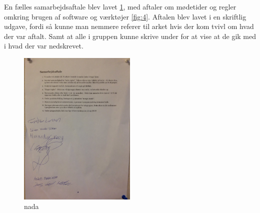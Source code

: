 En fælles samarbejdsaftale blev lavet \cref{fig:SAftale}, med aftaler om mødetider og regler omkring brugen af software og værktøjer \cref{fig:4}. Aftalen blev lavet i en skriftlig udgave, fordi så kunne man nemmere referer til arket hvis der kom tvivl om hvad der var aftalt. Samt at alle i gruppen kunne skrive under for at vise at de gik med i hvad der var nedskrevet.

\begin{figure}[ht!]
  \centering
  \includegraphics[width=0.5\textwidth]{Images/S_Aftale.jpg}
  \caption{nada}
  \label{fig:SAftale}
\end{figure}

